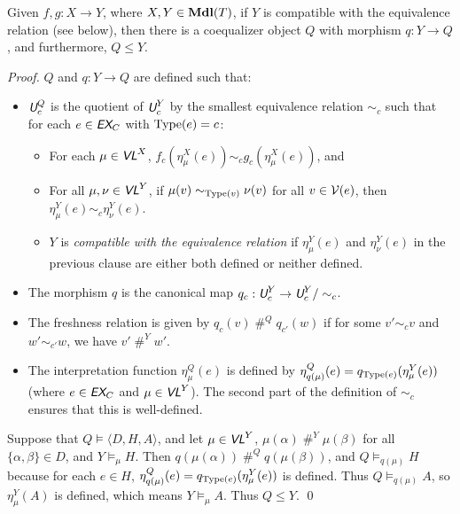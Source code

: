 \documentclass[runningheads,a4paper]{llncs}
\newcommand{\ec}{\textit{\textsf{EX}}_C} %
\newcommand{\vl}{\textit{\textsf{VL}}} %
\newcommand{\uv}{\textit{\textsf{U}}} %
\newcommand{\ang}[1]{\langle#1\rangle}
\newcommand{\type}{{\rm Type}}
\newcommand{\fresh}{\mathbin{\#}}
\begin{document}
\begin{theorem}\label{thm:quot}
Given $f,g:X\to Y$, where $X,Y\in{\bf Mdl}(T)$, if $Y$ is compatible with the equivalence relation (see below), then there is a coequalizer object $Q$ with morphism $q:Y\to Q$, and furthermore, $Q\le Y$.
\end{theorem}
\begin{proof}
$Q$ and $q:Y\to Q$ are defined such that:
\begin{itemize}
  \item $\uv^Q_c$ is the quotient of $\uv^Y_c$ by the smallest equivalence relation $\sim_c$ such that for each $e\in\ec$ with $\type(e)=c$:
  \begin{itemize}
    \item For each $\mu\in\vl^X$, $f_c(\eta^X_\mu(e))\sim_c g_c(\eta^X_\mu(e))$, and
    \item For all $\mu,\nu\in\vl^Y$, if $\mu(v)\sim_{\type(v)}\nu(v)$ for all $v\in{\cal V}(e)$, then $\eta^Y_\mu(e)\sim_c\eta^Y_\nu(e)$.
    \item $Y$ is {\em compatible with the equivalence relation} if $\eta^Y_\mu(e)$ and $\eta^Y_\nu(e)$ in the previous clause are either both defined or neither defined.
  \end{itemize}
  \item The morphism $q$ is the canonical map $q_c:\uv^Y_c\to\uv^Y_c/\sim_c$.
  \item The freshness relation is given by $q_c(v)\fresh^Q q_{c'}(w)$ if for some $v'\sim_c v$ and $w'\sim_{c'} w$, we have $v'\fresh^Y w'$.
  \item The interpretation function $\eta^Q_\mu(e)$ is defined by $\eta^Q_{q(\mu)}(e)=q_{\type(e)}(\eta^Y_\mu(e))$ (where $e\in\ec$ and $\mu\in\vl^Y$). The second part of the definition of $\sim_c$ ensures that this is well-defined.
\end{itemize}

Suppose that $Q\models\ang{D,H,A}$, and let $\mu\in\vl^Y$, $\mu(\alpha)\fresh^Y\mu(\beta)$ for all $\{\alpha,\beta\}\in D$, and $Y\models_\mu H$. Then $q(\mu(\alpha))\fresh^Qq(\mu(\beta))$, and $Q\models_{q(\mu)} H$ because for each $e\in H$, $\eta^Q_{q(\mu)}(e)=q_{\type(e)}(\eta^Y_\mu(e))$ is defined. Thus $Q\models_{q(\mu)} A$, so $\eta^Y_\mu(A)$ is defined, which means $Y\models_\mu A$. Thus $Q\le Y$.
\qed\end{proof}
\end{document}

